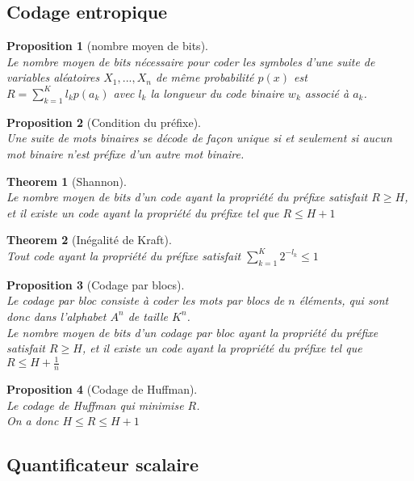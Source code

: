 \documentclass[a4paper]{article}
\newtheorem*{prop}{Proposition}
\newtheorem*{theorem}{Theorem}
\renewcommand{\leq}{\leqslant}
\renewcommand{\geq}{\geqslant}
\renewcommand{\(}{\left(}
\renewcommand{\)}{\right)}
\begin{document}
\subsection{Codage entropique}

\begin{prop}[nombre moyen de bits]~\\
  Le nombre moyen de bits nécessaire pour coder les symboles d'une suite de
  variables aléatoires $X_1,...,X_n$ de même probabilité $p(x)$ est $R =
  \sum\limits_{k=1}^{K}l_kp(a_k)$ avec $l_k$ la longueur du code binaire $w_k$
  associé à $a_k$.
\end{prop}

\begin{prop}[Condition du préfixe]~\\
  Une suite de mots binaires se décode de façon unique si et seulement si aucun
  mot binaire n'est préfixe d'un autre mot binaire.
\end{prop}

\begin{theorem}[Shannon]~\\
  Le nombre moyen de bits d'un code ayant la propriété du préfixe satisfait
  $R \geq H$, et il existe un code ayant la propriété du préfixe tel que
  $R \leq H+1$
\end{theorem}

\begin{theorem}[Inégalité de Kraft]~\\
  Tout code ayant la propriété du préfixe satisfait
  $\sum\limits_{k=1}^K 2^{-l_k} \leq 1$
\end{theorem}

\begin{prop}[Codage par blocs]~\\
  Le codage par bloc consiste à coder les mots par blocs de $n$ éléments, qui
  sont donc dans l'alphabet $A^n$ de taille $K^n$.\\
  Le nombre moyen de bits d'un codage par bloc ayant la propriété du préfixe satisfait
  $R \geq H$, et il existe un code ayant la propriété du préfixe tel que
  $R \leq H+\frac{1}{n}$
\end{prop}

\begin{prop}[Codage de Huffman]~\\
  Le codage de Huffman qui minimise $R$.\\
  On a donc $H \leq R \leq H+1$
\end{prop}

\subsection{Quantificateur scalaire}
\end{document}
